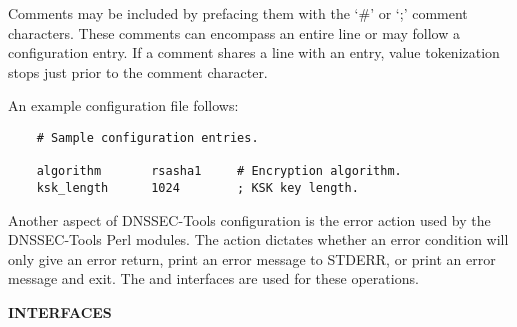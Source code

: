 Comments may be included by prefacing them with the `\#' or `;' comment
characters.  These comments can encompass an entire line or may follow a
configuration entry.  If a comment shares a line with an entry, value
tokenization stops just prior to the comment character.

An example configuration file follows:

\begin{verbatim}
    # Sample configuration entries.

    algorithm       rsasha1     # Encryption algorithm.
    ksk_length      1024        ; KSK key length.
\end{verbatim}

Another aspect of DNSSEC-Tools configuration is the error action used by the
DNSSEC-Tools Perl modules.  The action dictates whether an error condition
will only give an error return, print an error message to STDERR, or print an
error message and exit.  The  and  interfaces
are used for these operations.

{\bf INTERFACES}

